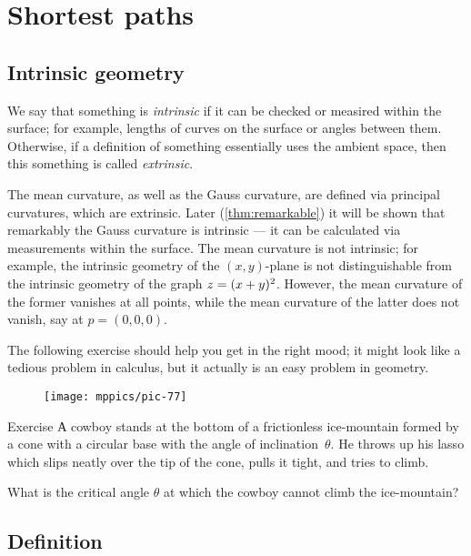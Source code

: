 \chapter{Shortest paths}
\label{chap:shortest}

\section{Intrinsic geometry}

We say that something is \emph{intrinsic} if it can be checked or measired within the surface;
for example, lengths of curves on the surface or angles between them.
Otherwise, if a definition of something essentially uses the ambient space, then this something is called \emph{extrinsic}.

The mean curvature, as well as the Gauss curvature, are defined via principal curvatures, which are extrinsic.
Later (\ref{thm:remarkable}) it will be shown that remarkably the Gauss curvature is intrinsic --- it can be calculated via measurements within the surface.
The mean curvature is not intrinsic; for example, the intrinsic geometry of the $(x,y)$-plane is not distinguishable from the intrinsic geometry of the graph $z\z=(x+y)^2$.
However, the mean curvature of the former vanishes at all points, while the mean curvature of the latter does not vanish, say at $p=(0,0,0)$.  

The following exercise should help you get in the right mood;
it might look like a tedious problem in calculus, but it actually is an easy problem in geometry.

\begin{wrapfigure}[6]{r}{33 mm}
\vskip-0mm
\centering
\texttt{[image: mppics/pic-77]}
\vskip-0mm
\end{wrapfigure}

\begin{thm}{Exercise}\label{ex:lasso}
А cowboy stands at the bottom of a frictionless ice-mountain formed by a cone with a circular base with the angle of inclination~$\theta$.
He throws up his lasso which slips neatly over the tip of the cone, pulls it tight, and tries to climb.

What is the critical angle $\theta$ at which the cowboy cannot climb the ice-mountain?
\end{thm}

\section{Definition}

